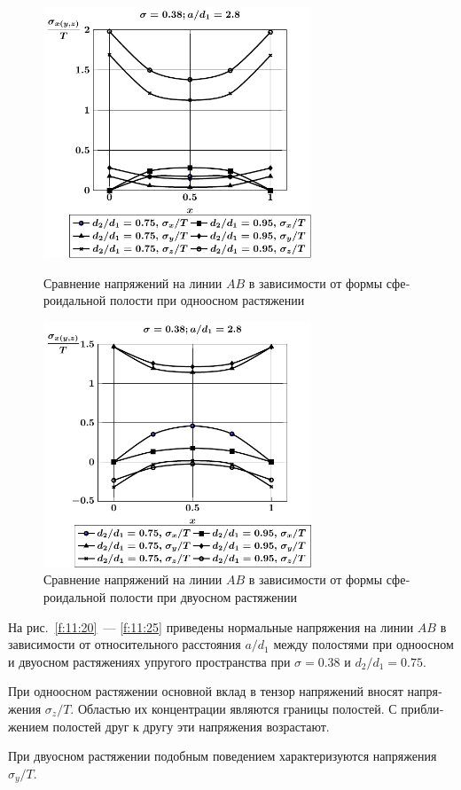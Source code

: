 \begin{russian}
\begin{figure}[h!]
\centering\footnotesize
\parbox[b]{7.5cm}{\centering\includegraphics[width=8cm]{periodic-cav27-d-a28-t1.pdf}
\caption{Сравнение напряжений на линии $AB$ в зависимости от формы сфероидальной полости при одноосном растяжении
\label{f:11:31}}}\hfil\hfil
\parbox[b]{7.5cm}{\centering\includegraphics[width=8cm]{periodic-cav27-d-a28-t2.pdf}
\caption{Сравнение напряжений на линии $AB$ в зависимости от формы сфероидальной полости при двуосном растяжении
\label{f:11:32}}}
\end{figure}

На рис.~\ref{f:11:20}~--- \ref{f:11:25} приведены нормальные напряжения на линии $AB$ в зависимости от относительного расстояния $a/d_1$ между полостями при одноосном и двуосном растяжениях упругого пространства при $\sigma=0.38$ и $d_2/d_1=0.75$.

При одноосном растяжении основной вклад в тензор напряжений вносят напряжения $\sigma_z/T$. Областью их концентрации являются границы полостей. С приближением полостей друг к другу эти напряжения возрастают.

При двуосном растяжении подобным поведением характеризуются напряжения $\sigma_y/T$.


\end{russian}
